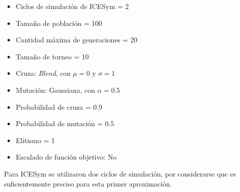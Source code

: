 \begin{itemize}
        \item Ciclos de simulación de ICESym = 2
        \item Tamaño de población = 100
        \item Cantidad máxima de generaciones = 20
        \item Tamaño de torneo =  10
        \item Cruza: \emph{Blend}, con $\mu = 0$ y $\sigma = 1$
        \item Mutación: Gaussiana, con $\alpha = 0.5$
        \item Probabilidad de cruza = 0.9
        \item Probabilidad de mutación = 0.5
        \item Elitismo = 1
        \item Escalado de función objetivo: No
\end{itemize}

Para ICESym se utilizaron dos ciclos de simulación, por considerarse que es
suficientemente preciso para esta primer aproximación.
%




